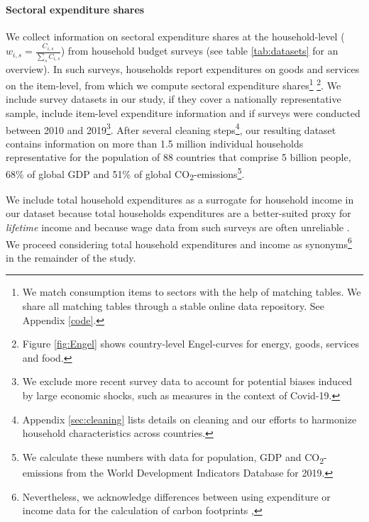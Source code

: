 \documentclass[12pt, a4paper]{article}
\begin{document}
\paragraph{Sectoral expenditure shares} We collect information on sectoral expenditure shares at the household-level ($w_{i,s}=\frac{C_{i,s}}{\sum_{s}C_{i,s}}$) from household budget surveys (see table \ref{tab:datasets} for an overview). In such surveys, households report expenditures on goods and services on the item-level, from which we compute sectoral expenditure shares\footnote{We match consumption items to sectors with the help of matching tables. We share all matching tables through a stable online data repository. See Appendix \ref{code}.} \footnote{Figure \ref{fig:Engel} shows country-level Engel-curves for energy, goods, services and food.}. We include survey datasets in our study, if they cover a nationally representative sample, include item-level expenditure information and if surveys were conducted between 2010 and 2019\footnote{We exclude more recent survey data to account for potential biases induced by large economic shocks, such as measures in the context of Covid-19.}. After several cleaning steps\footnote{Appendix \ref{sec:cleaning} lists details on cleaning and our efforts to harmonize household characteristics across countries.}, our resulting dataset contains information on more than 1.5 million individual households representative for the population of 88 countries that comprise 5 billion people, 68\% of global GDP and 51\% of global CO\textsubscript{2}-emissions\footnote{We calculate these numbers with data for population, GDP and CO\textsubscript{2}-emissions from the World Development Indicators Database \autocite{WorldBankGroup.2023} for 2019.}.

We include total household expenditures as a surrogate for household income in our dataset because total households expenditures are a better-suited proxy for \textit{lifetime} income \autocite{Poterba.1989,Poterba.1991,Cronin.2019} and because wage data from such surveys are often unreliable \autocite{Blundell.1998}. We proceed considering total household expenditures and income as synonyms\footnote{Nevertheless, we acknowledge differences between using expenditure or income data for the calculation of carbon footprints \autocite[see][]{Levay.2023},} in the remainder of the study.
\end{document}
